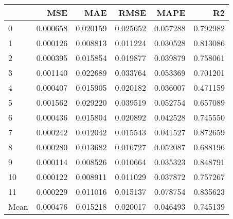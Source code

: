 \begin{tabular}{lrrrrr}
\toprule
 & MSE & MAE & RMSE & MAPE & R2 \\
\midrule
0 & 0.000658 & 0.020159 & 0.025652 & 0.057288 & 0.792982 \\
1 & 0.000126 & 0.008813 & 0.011224 & 0.030528 & 0.813086 \\
2 & 0.000395 & 0.015854 & 0.019877 & 0.039879 & 0.758061 \\
3 & 0.001140 & 0.022689 & 0.033764 & 0.053369 & 0.701201 \\
4 & 0.000407 & 0.015905 & 0.020182 & 0.036007 & 0.471159 \\
5 & 0.001562 & 0.029220 & 0.039519 & 0.052754 & 0.657089 \\
6 & 0.000436 & 0.015804 & 0.020892 & 0.042528 & 0.745550 \\
7 & 0.000242 & 0.012042 & 0.015543 & 0.041527 & 0.872659 \\
8 & 0.000280 & 0.013682 & 0.016727 & 0.052087 & 0.688196 \\
9 & 0.000114 & 0.008526 & 0.010664 & 0.035323 & 0.848791 \\
10 & 0.000122 & 0.008911 & 0.011029 & 0.037872 & 0.757267 \\
11 & 0.000229 & 0.011016 & 0.015137 & 0.078754 & 0.835623 \\
Mean & 0.000476 & 0.015218 & 0.020017 & 0.046493 & 0.745139 \\
\bottomrule
\end{tabular}
